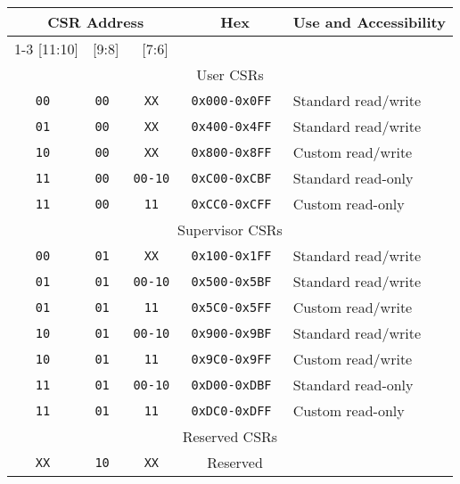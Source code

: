 \vspace{0.2in}
\begin{table*}[h!]
\begin{center}
\begin{tabular}{|c|c|c|c|l|}
\hline
\multicolumn{3}{|c|}{CSR Address} & Hex & \multicolumn{1}{c|}{Use and Accessibility}\\ \cline{1-3}
[11:10] & [9:8] & [7:6]                  &  & \\
\hline
\multicolumn{5}{|c|}{User CSRs}  \\
\hline
\tt   00   &\tt   00  &\tt   XX     & \tt 0x000-0x0FF & Standard read/write \\ 
\tt   01   &\tt   00  &\tt   XX     & \tt 0x400-0x4FF & Standard read/write \\ 
\tt   10   &\tt   00  &\tt   XX     & \tt 0x800-0x8FF & Custom read/write \\ 
\tt   11   &\tt   00  &\tt   00-10  & \tt 0xC00-0xCBF & Standard read-only \\
\tt   11   &\tt   00  &\tt   11     & \tt 0xCC0-0xCFF & Custom read-only \\
\hline
\multicolumn{5}{|c|}{Supervisor CSRs}  \\
\hline                                         
\tt   00   &\tt   01  &\tt   XX     & \tt 0x100-0x1FF & Standard read/write \\ 
\tt   01   &\tt   01  &\tt   00-10  & \tt 0x500-0x5BF & Standard read/write \\ 
\tt   01   &\tt   01  &\tt   11     & \tt 0x5C0-0x5FF & Custom read/write \\ 
\tt   10   &\tt   01  &\tt   00-10  & \tt 0x900-0x9BF & Standard read/write \\ 
\tt   10   &\tt   01  &\tt   11     & \tt 0x9C0-0x9FF & Custom read/write \\ 
\tt   11   &\tt   01  &\tt   00-10  & \tt 0xD00-0xDBF & Standard read-only \\
\tt   11   &\tt   01  &\tt   11     & \tt 0xDC0-0xDFF & Custom read-only \\
\hline
\multicolumn{5}{|c|}{Reserved CSRs} \\
\hline                                         
\tt   XX   &\tt   10  &\tt   XX     & Reserved & \\

\end{tabular}
\end{center}
\end{table*}
